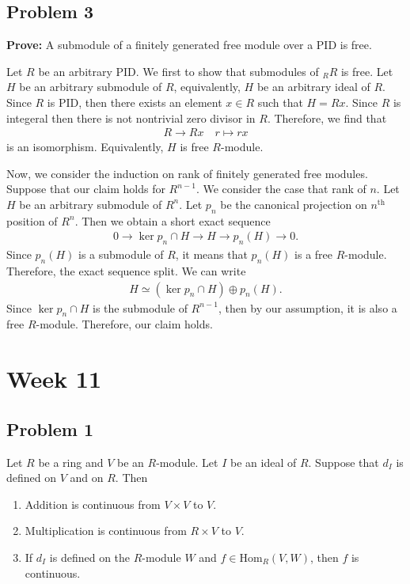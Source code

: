 \subsection*{Problem 3}
\textbf{Prove:} A submodule of a finitely generated free module over a PID is free.

\begin{solution}
    Let $R$ be an arbitrary PID. We first to show that submodules of $_R R$ is free.
    Let $H$ be an arbitrary submodule of $R$, equivalently, $H$ be an arbitrary ideal of $R$.
    Since $R$ is PID, then there exists an element $x\in R$ such that $H=Rx$. Since $R$ is integeral then there 
    is not nontrivial zero divisor in $R$. Therefore, we find that 
    \begin{align*}
        R \to Rx\quad r\mapsto rx
    \end{align*} 
    is an isomorphism. Equivalently, $H$ is free $R$-module.

    Now, we consider the induction on rank of finitely generated free modules. 
    Suppose that our claim holds for $R^{n-1}$.
    We consider the case that rank of $n$.
    Let $H$ be an arbitrary submodule of $R^n$. Let $p_n$ be the canonical projection on $n^\text{th}$ position of $R^n$.
    Then we obtain a short exact sequence 
    \begin{align*}
        0\to \ker p_n\cap H\to H \to p_n(H) \to 0.
    \end{align*}
    Since $p_n(H)$ is a submodule of $R$, it means that $p_n(H)$ is a free $R$-module. Therefore, the exact sequence split.
    We can write 
    \begin{align*}
        H \simeq (\ker p_n\cap H)\oplus p_n(H).
    \end{align*}
    Since $\ker p_n\cap H$ is the submodule of $R^{n-1}$, then by our assumption, it is also a free $R$-module.
    Therefore, our claim holds.
\end{solution}
\section{Week 11}
\subsection*{Problem 1}
Let $R$ be a ring and $V$ be an $R$-module. Let $I$ be an ideal of $R$. Suppose that $d_I$ is defined on $V$ and on $R$. Then
\begin{enumerate}
    \item[(i)] Addition is continuous from $V \times V$ to $V$.
    \item[(ii)] Multiplication is continuous from $R \times V$ to $V$.
    \item[(iii)] If $d_I$ is defined on the $R$-module $W$ and $f \in \mathrm{Hom}_R(V,W)$, then $f$ is continuous.
\end{enumerate}


